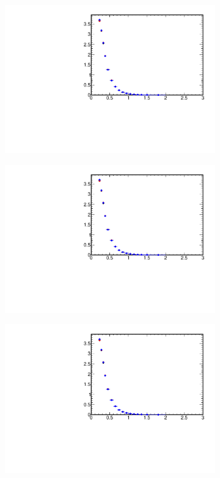 \begin{figure}[h!]
	\centering
	\begin{subfigure}{.49\textwidth}	
		\includegraphics[width=\textwidth,page=2]{chapters/chrgSTAR/img/syst/out_chargedmax.pdf}
	\end{subfigure}
	\begin{subfigure}{.49\textwidth}
		\includegraphics[width=\textwidth,page=9]{chapters/chrgSTAR/img/syst/out_chargedmax.pdf}
	\end{subfigure}
	\begin{subfigure}{.49\textwidth}
		\includegraphics[width=\textwidth,page=16]{chapters/chrgSTAR/img/syst/out_chargedmax.pdf}

\end{subfigure}
\end{figure}
